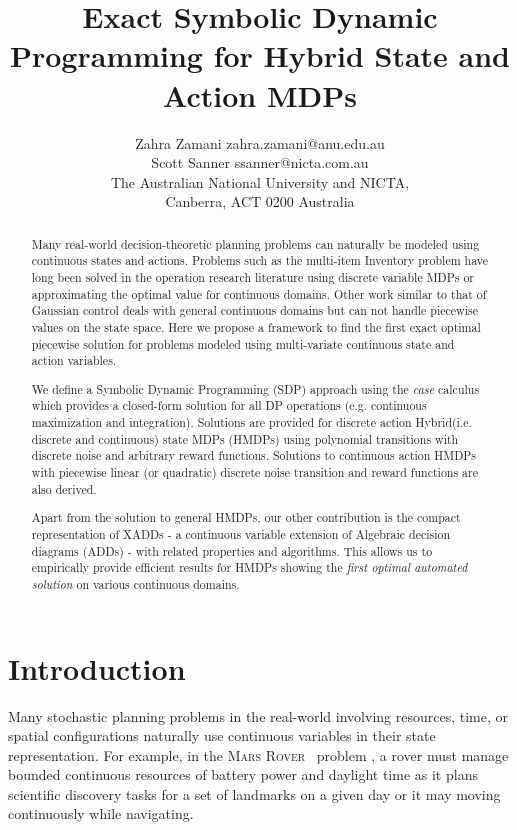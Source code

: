 \documentclass[twoside,11pt]{article}
\newcommand{\MarsRover}{\textsc{Mars Rover }}
\begin{document}
\title{Exact Symbolic Dynamic Programming for Hybrid State and Action MDPs}

\author{\name Zahra Zamani \email zahra.zamani@anu.edu.au \\
       \name Scott Sanner \email ssanner@nicta.com.au \\
       \addr The Australian National University and NICTA,\\
       Canberra, ACT 0200 Australia       
}

\maketitle


\begin{abstract}
Many real-world decision-theoretic planning problems can naturally be modeled using continuous states and actions. Problems such as the multi-item Inventory problem \cite{Scarf_Karlin58} have long been solved in the operation research literature using discrete variable MDPs or approximating the optimal value for continuous domains. Other work similar to that of Gaussian control deals with general continuous domains but can not handle piecewise values on the state space. Here we propose a framework to find the first exact optimal piecewise solution for problems modeled using multi-variate continuous state and action variables.

We define a Symbolic Dynamic Programming (SDP) approach using the \emph{case} calculus which provides a closed-form solution for all DP operations (e.g. continuous maximization and integration). Solutions are provided for discrete action Hybrid(i.e. discrete and continuous) state MDPs (HMDPs) using polynomial transitions with discrete noise and arbitrary reward functions. Solutions to continuous action HMDPs with piecewise linear (or quadratic) discrete noise transition and reward functions are also derived. 

Apart from the solution to general HMDPs, our other contribution is the compact representation of XADDs - a continuous variable extension of Algebraic decision diagrams (ADDs) - with related properties and algorithms. This allows us to empirically provide efficient results for HMDPs showing the \emph{first optimal automated solution} on various continuous domains. 
\end{abstract}

\section{Introduction}
\label{Introduction}
Many stochastic planning problems in the real-world involving resources, time, or spatial configurations naturally use continuous variables in their state representation.  For example, in the \MarsRover\  problem \cite{bresina02}, a rover must manage bounded continuous resources of battery power and daylight time as it plans scientific discovery tasks for a set of landmarks on a given day or it may moving continuously while navigating. 
\end{document}
